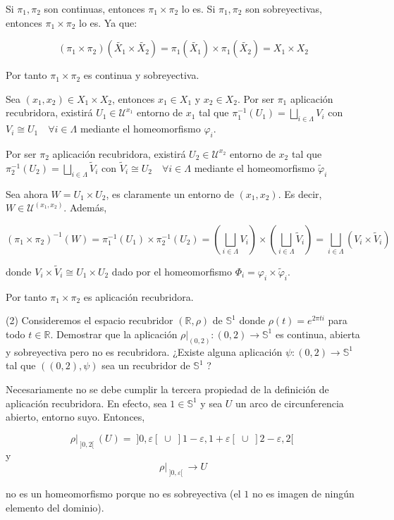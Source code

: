 \documentclass[
  a4paper,
  spanish,
  12pt,
]{scrartcl}
\begin{document}
\begin{sol}
Si $\pi_1, \pi_2$ son continuas, entonces $\pi_1 \times \pi_2$ lo es.
Si $\pi_1, \pi_2$ son sobreyectivas, entonces $\pi_1 \times \pi_2$ lo es. Ya que:

$$
(\pi_1 \times \pi_2)(\tilde{X_1} \times \tilde{X_2}) = \pi_1(\tilde{X_1}) \times \pi_1(\tilde{X_2}) = X_1 \times X_2
$$

Por tanto $\pi_1 \times \pi_2$ es continua y sobreyectiva.

Sea $(x_1, x_2) \in X_1 \times X_2$, entonces $x_1 \in X_1$ y $x_2 \in X_2$.
Por ser $\pi_1$ aplicación recubridora, existirá $U_1 \in \mathcal{U}^{x_1}$ entorno de $x_1$ tal que
$\pi_1^{-1}(U_1) = \bigsqcup_{i \in \Lambda} V_i$ con $V_i \cong U_1 \quad \forall i \in \Lambda$ mediante
el homeomorfismo $\varphi_i$.

Por ser $\pi_2$ aplicación recubridora, existirá $U_2 \in \mathcal{U}^{x_2}$ entorno de $x_2$ tal que
$\pi_2^{-1}(U_2) = \bigsqcup_{i \in \Lambda} \tilde{V}_i$ con $\tilde{V}_i \cong U_2 \quad \forall i \in \Lambda$ mediante
el homeomorfismo $\tilde{\varphi}_i$

Sea ahora $W = U_1 \times U_2$, es claramente un entorno de $(x_1, x_2)$. Es decir, $W \in \mathcal{U}^{(x_1, x_2)}$.
Además,

$$
(\pi_1 \times \pi_2)^{-1}(W) = \pi_1^{-1}(U_1) \times \pi_2^{-1}(U_2) = 
\left(\bigsqcup_{i \in \Lambda} V_i \right)  \times \left(\bigsqcup_{i \in \Lambda} \tilde{V}_i \right) 
= \bigsqcup_{i \in \Lambda} (V_i \times \tilde{V}_i )
$$

donde $V_i \times \tilde{V}_i \cong U_1 \times U_2$ dado por el homeomorfismo $\Phi_i = \varphi_i \times \tilde{\varphi}_i$.

Por tanto $\pi_1 \times \pi_2$ es aplicación recubridora.
\end{sol}

\newpage

\begin{ejer}
(2) Consideremos el espacio recubridor $(\mathbb{R}, \rho)$ de $\mathbb{S}^{1}$ donde $\rho(t)=e^{2 \pi t i}$ para todo $t \in \mathbb{R}$. Demostrar que la aplicación $\left.\rho\right|_{(0,2)}:(0,2) \rightarrow \mathbb{S}^{1}$ es continua, abierta y sobreyectiva pero no es recubridora. ¿Existe alguna aplicación $\psi:(0,2) \rightarrow \mathbb{S}^{1}$ tal que $((0,2), \psi)$ sea un recubridor de $\mathbb{S}^{1}$ ?\\
\end{ejer}

\begin{sol}
Necesariamente no se debe cumplir la tercera propiedad de la definición de aplicación recubridora.
En efecto, sea $1 \in \mathbb{S}^1$ y sea $U$ un arco de circunferencia abierto, entorno suyo. Entonces,

$$
\rho\vert_{\;]0,2[\;} (U) = \;]0, \varepsilon[\; \cup \;]1-\varepsilon, 1+\varepsilon[\; \cup \;]2-\varepsilon, 2[\;
$$
y 
$$
\rho\vert_{\;]0, \varepsilon[\;} \to U
$$

no es un homeomorfismo porque no es sobreyectiva (el \( 1 \) no es imagen de ningún elemento del dominio).

\end{sol}
\end{document}
